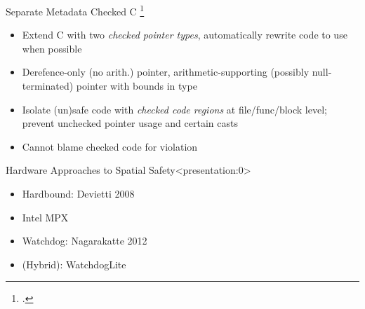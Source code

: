 \documentclass[aspectratio=169]{beamer}
\begin{document}
\begin{frame}{Separate Metadata}
Checked C \footcite{ruef_checked_2017}
    \begin{itemize}
        \item Extend C with two \emph{checked pointer types}, automatically rewrite code to use when possible
        \item Derefence-only (no arith.) pointer, arithmetic-supporting (possibly null-terminated) pointer with bounds in type
        \item Isolate (un)safe code with \emph{checked code regions} at file/func/block level; prevent unchecked pointer usage and certain casts
        \item Cannot blame checked code for violation
    \end{itemize}
\end{frame}


\begin{frame}{Hardware Approaches to Spatial Safety}<presentation:0>
    \begin{itemize}
       \item Hardbound: Devietti 2008
       \item Intel MPX %
       \item Watchdog: Nagarakatte 2012
       \item (Hybrid): WatchdogLite
    \end{itemize}
\end{frame}
\end{document}

